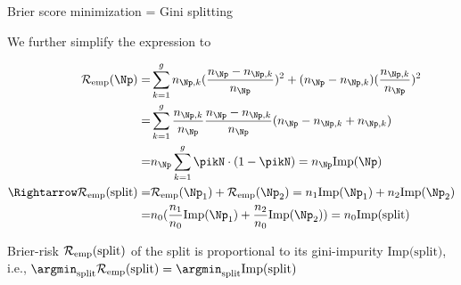 \documentclass[11pt,compress,t,notes=noshow, xcolor=table]{beamer}
\begin{document}
\begin{frame2}[small]{Brier score minimization = Gini splitting}

We further simplify the expression to

\begin{align*}
\riske(\Np) =&  \sum_{k = 1}^g n_{\Np,k}(\frac{n_{\Np } - n_{\Np,k}}{n_{\Np }})^2 + (n_{\Np } - n_{\Np,k})(\frac{n_{\Np,k}}{n_{\Np }})^2 \\
=& \sum_{k = 1}^g \frac{n_{\Np,k}}{n_{\Np }} \frac{n_{\Np } - n_{\Np,k}}{n_{\Np }} (n_{\Np } - n_{\Np,k } + n_{\Np,k}) \\
=& n_{\Np } \sum_{k = 1}^g \pikN \cdot (1 - \pikN ) = n_\Np \text{Imp}(\Np)\\
\Rightarrow \riske(\text{split}) =& \riske(\Np_1) + \riske(\Np_2)  = n_1 \text{Imp}(\Np_1) + n_2 \text{Imp}(\Np_2)\\
=&n_0 (\frac{n_1}{n_0} \text{Imp}(\Np_1) + \frac{n_2}{n_0} \text{Imp}(\Np_2)) = n_0\text{Imp(split)}\\
\end{align*} 

Brier-risk $\mathcal{R}_{\text{emp}}(\text{split})$ of the split is proportional to its gini-impurity $\text{Imp(split)}$, i.e., $\argmin_\text{split} \riske(\text{split}) = \argmin_\text{split} \text{Imp(split)}$\\

\end{frame2}


\endlecture
\end{document}
